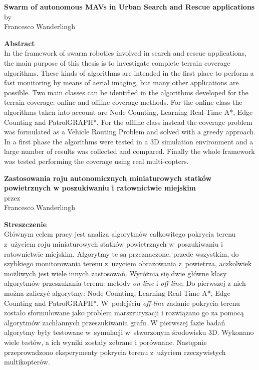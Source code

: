 \begin{center}
\Large {\textbf{Swarm of autonomous MAVs in Urban Search and Rescue applications}}\\
\large {by  \\
Francesco Wanderlingh}
\end{center}

\vskip 1cm
\Large {\textbf{Abstract}} \\ 

\large{
In the framework of swarm robotics involved in search and rescue applications, the main purpose of this thesis is to investigate complete 
terrain coverage algorithms. These kinds of algorithms are intended in the first place to perform a fast monitoring by means of aerial 
imaging, but many other applications are possible. Two main classes can be identified in the algorithms developed for the terrain coverage: 
online and offline coverage methods. For the online class the algorithms taken into account are Node Counting, Learning Real-Time A*, Edge 
Counting and PatrolGRAPH*. For the offline class instead the coverage problem was formulated as a Vehicle Routing Problem and solved with a 
greedy approach. In a first phase the algorithms were tested in a 3D simulation environment and a large number of results was collected and 
compared. Finally the whole framework was tested performing the coverage using real multi-copters. }
\clearpage
\null\newpage

\begin{center}
\Large {\bf{Zastosowania roju autonomicznych miniaturowych statków powietrznych w poszukiwaniu i ratownictwie miejskim}}\\
\large {przez  \\
Francesco Wanderlingh}
\end{center}

\vskip 1cm
\Large {\textbf{Streszczenie}} \\


\large{
Głównym celem pracy jest analiza algorytmów całkowitego pokrycia terenu z~użyciem roju miniaturowych statków powietrznych 
w~poszukiwaniu i ratownictwie miejskim. Algorytmy te są przeznaczone, przede wszystkim, do szybkiego monitorowania terenu 
z~użyciem obrazowania z~powietrza, aczkolwiek możliwych jest wiele innych zastosowań. Wyróżnia się dwie główne klasy algorytmów 
przeszukania terenu: metody \emph{on-line} i \emph{off-line}. Do pierwszej z nich można zaliczyć algorytmy: Node Counting, 
Learning Real-Time A*, Edge Counting and PatrolGRAPH*. W~podejściu \emph{off-line} zadanie pokrycia terenu zostało sformułowane 
jako problem marszrutyzacji i rozwiązano go za pomocą algorytmów zachłannych przeszukiwania grafu. W pierwszej fazie badań algorytmy 
były testowane w~symulacji w~stworzonym środowisku 3D. Wykonano wiele testów, a ich wyniki zostały zebrane i porównane. Następnie przeprowadzono 
eksperymenty pokrycia terenu z~użyciem rzeczywistych multikopterów.   
}
\clearpage
